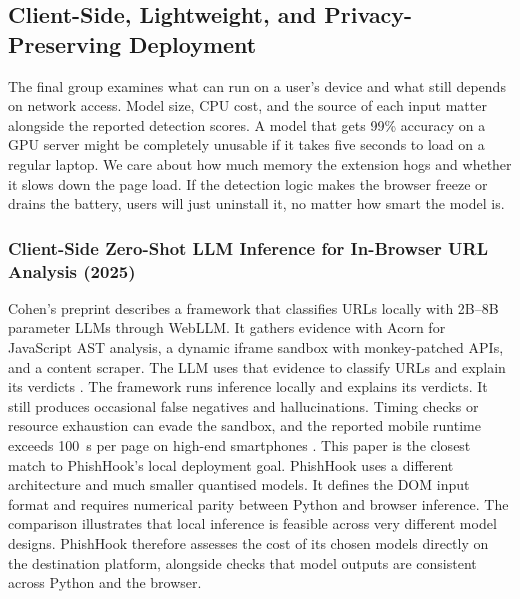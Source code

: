 \documentclass{FastFyp}
\begin{document}
\subsection{Client-Side, Lightweight, and Privacy-Preserving Deployment}
The final group examines what can run on a user's device and what still depends on network access. Model size, CPU cost, and the source of each input matter alongside the reported detection scores. A model that gets 99\% accuracy on a GPU server might be completely unusable if it takes five seconds to load on a regular laptop. We care about how much memory the extension hogs and whether it slows down the page load. If the detection logic makes the browser freeze or drains the battery, users will just uninstall it, no matter how smart the model is.

\subsubsection{Client-Side Zero-Shot LLM Inference for In-Browser URL Analysis (2025)}
Cohen's preprint describes a framework that classifies URLs locally with 2B--8B parameter LLMs through WebLLM. It gathers evidence with Acorn for JavaScript AST analysis, a dynamic iframe sandbox with monkey-patched APIs, and a content scraper. The LLM uses that evidence to classify URLs and explain its verdicts \cite{zeroshotllm2025}. The framework runs inference locally and explains its verdicts. It still produces occasional false negatives and hallucinations. Timing checks or resource exhaustion can evade the sandbox, and the reported mobile runtime exceeds 100~s per page on high-end smartphones \cite{zeroshotllm2025}. This paper is the closest match to PhishHook's local deployment goal. PhishHook uses a different architecture and much smaller quantised models. It defines the DOM input format and requires numerical parity between Python and browser inference. The comparison illustrates that local inference is feasible across very different model designs. PhishHook therefore assesses the cost of its chosen models directly on the destination platform, alongside checks that model outputs are consistent across Python and the browser.
\end{document}
